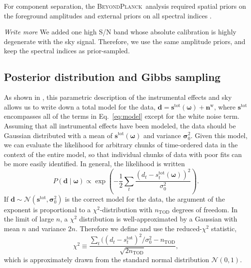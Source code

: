 \documentclass[twocolumn]{../../common/aa}
\newcommand{\bp}{\textsc{BeyondPlanck}}
\begin{document}
For component separation, the \bp\ analysis required spatial priors on the foreground amplitudes and external priors on all spectral indices \citep{bp13}.

\textit{Write more} We added one high S/N band whose absolute calibration is highly degenerate with the sky signal. Therefore, we use the same amplitude priors, and keep the spectral indices as prior-sampled.


\subsection{Posterior distribution and Gibbs sampling}

As shown in \citet{bp01}, this parametric description of the instrumental effects and sky allows us to write down a total model for the data, $\boldsymbol d=\boldsymbol s^\mathrm{tot}(\boldsymbol\omega)+\boldsymbol n^\mathrm w$, where $\boldsymbol s^\mathrm{tot}$ encompasses all of the terms in Eq.~\eqref{eq:model} except for the white noise term. Assuming that all instrumental effects have been modeled, the data should be Gaussian distributed with a mean of $\boldsymbol s^\mathrm{tot}(\boldsymbol\omega)$ and variance $\boldsymbol \sigma_0^2$. Given this model, we can evaluate the likelihood for arbitrary chunks of time-ordered data in the context of the entire model, so that individual chunks of data with poor fits can be more easily identified. In general, the likelihood is written
\begin{equation}
	P(\boldsymbol d\mid\boldsymbol\omega)\propto\exp\left(-\frac12\sum_t\frac{(d_t-s^\mathrm{tot}_t(\boldsymbol\omega))^2}{\sigma_0^2}
	\right).
\end{equation}
If $\boldsymbol d\sim\mathcal N(\boldsymbol s^\mathrm{tot},\boldsymbol\sigma_0^2)$ is the correct model for the data, the argument of the exponent is proportional to a $\chi^2$-distribution with $n_\mathrm{TOD}$ degrees of freedom. In the limit of large $n$, a $\chi^2$ distribution is well-approximated by a Gaussian with mean $n$ and variance $2n$. Therefore we define and use the reduced-$\chi^2$ statistic,
\begin{equation}
	\chi^2\equiv \frac{\sum_t((d_t-s_t^\mathrm{tot})^2/\sigma_0^2 - n_\mathrm{TOD}}{\sqrt{2n_\mathrm{TOD}}},
\end{equation}
which is approximately drawn from the standard normal distribution $\mathcal N(0,1)$.
\end{document}
